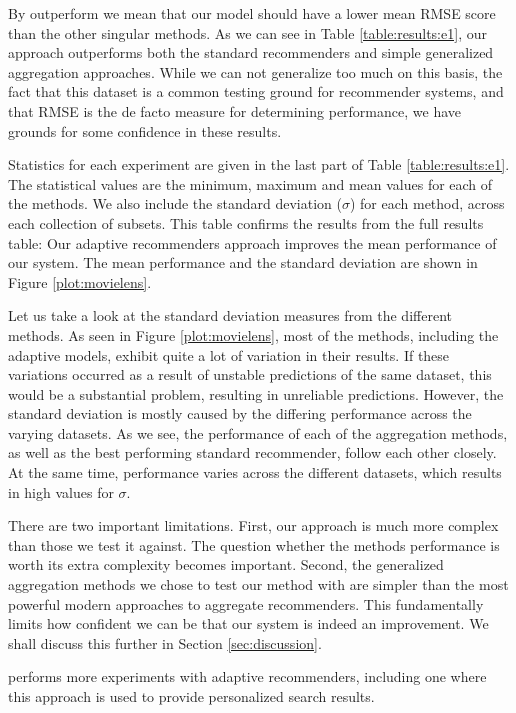 By outperform we mean that our model should have a lower
mean RMSE score than the other singular methods. As we can see in Table \ref{table:results:e1},
our approach outperforms both the standard recommenders
and simple generalized aggregation approaches.
While we can not generalize too much on this basis, 
the fact that this dataset is a common testing ground for recommender systems,
and that RMSE is the de facto measure for determining performance,
we have grounds for some confidence in these results.



Statistics for each experiment are given in the last
part of Table \ref{table:results:e1}. 
The statistical values are the minimum, maximum and mean values
for each of the methods. We also include
the standard deviation ($\sigma$) for each method,
across each collection of subsets.
This table confirms the results from the full results table:
Our adaptive recommenders approach improves the mean performance
of our system.
The mean performance and the standard deviation
are shown in Figure \ref{plot:movielens}.


%

Let us take a look at the standard deviation measures from the different methods.
As seen in Figure \ref{plot:movielens}, 
most of the methods, including the adaptive models,
exhibit quite a lot of variation in their results.
If these variations occurred as a result of unstable
predictions of the same dataset, this would be a substantial problem,
resulting in unreliable predictions.
However, the standard deviation is mostly caused by the differing
performance across the varying datasets.
As we see, the performance of each of the aggregation methods,
as well as the best performing standard recommender,
follow each other closely. At the same time,
performance varies across the different datasets,
which results in high values for $\sigma$.

There are two important limitations.
First, our approach is much more complex than those we test it against.
The question whether the methods performance is worth its extra complexity becomes important.
Second, the generalized aggregation methods we chose to test our method with
are simpler than the most powerful modern approaches to aggregate recommenders.
This fundamentally limits how confident we can be that our system
is indeed an improvement.
We shall discuss this further in Section \ref{sec:discussion}.

\cite{Bjorkoy2011} performs more experiments with adaptive recommenders,
including one where this approach is used to provide personalized search results.


